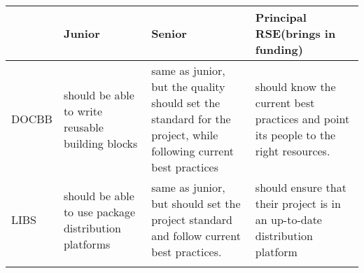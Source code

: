 \documentclass[a4paper
]{article}
\begin{document}
\begin{landscape}

\begin{longtable}[]{@{}llll@{}}
\toprule
\begin{minipage}[b]{0.19\columnwidth}\raggedright
\strut
\end{minipage} & \begin{minipage}[b]{0.28\columnwidth}\raggedright
Junior\strut
\end{minipage} & \begin{minipage}[b]{0.28\columnwidth}\raggedright
Senior\strut
\end{minipage} & \begin{minipage}[b]{0.14\columnwidth}\raggedright
Principal RSE(brings in funding)\strut
\end{minipage}\tabularnewline
\midrule
\endhead
\begin{minipage}[t]{0.19\columnwidth}\raggedright
DOCBB\strut
\end{minipage} & \begin{minipage}[t]{0.28\columnwidth}\raggedright
should be able to write reusable building blocks\strut
\end{minipage} & \begin{minipage}[t]{0.28\columnwidth}\raggedright
same as junior, but the quality should set the standard for the project,
while following current best practices\strut
\end{minipage} & \begin{minipage}[t]{0.14\columnwidth}\raggedright
should know the current best practices and point its people to the right
resources.\strut
\end{minipage}\tabularnewline
\begin{minipage}[t]{0.19\columnwidth}\raggedright
LIBS\strut
\end{minipage} & \begin{minipage}[t]{0.28\columnwidth}\raggedright
should be able to use package distribution platforms\strut
\end{minipage} & \begin{minipage}[t]{0.28\columnwidth}\raggedright
same as junior, but should set the project standard and follow current
best practices.\strut
\end{minipage} & \begin{minipage}[t]{0.14\columnwidth}\raggedright
should ensure that their project is in an up-to-date distribution
platform\strut
\end{minipage}\tabularnewline
\begin{minipage}[t]{0.19\columnwidth}\raggedright

\end{minipage}
\end{longtable}
\end{landscape}
\end{document}
